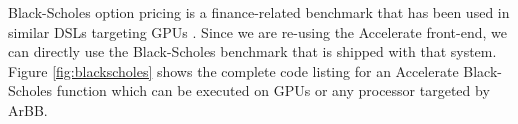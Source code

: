 







Black-Scholes option pricing is a finance-related benchmark that has been used in similar
DSLs targeting GPUs \cite{Accelerate, nikola}. Since we are re-using the 
Accelerate front-end, we can directly use the Black-Scholes benchmark that 
is shipped with that system.  Figure \ref{fig:blackscholes} shows the
complete code listing for an Accelerate Black-Scholes function which
can be executed on GPUs or any processor targeted by ArBB.

%


